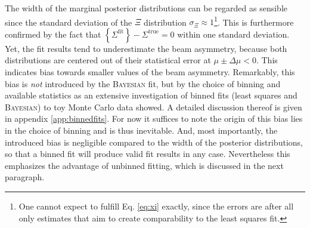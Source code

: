 The width of the marginal posterior distributions can be regarded as sensible since the standard deviation of the $\Xi$ distribution $\sigma_\Xi\approx1$\footnote{One cannot expect to fulfill Eq. \eqref{eq:xi} exactly, since the errors are after all only estimates that aim to create comparability to the least squares fit.}. This is furthermore confirmed by the fact that $\left\{\Sigma^\text{fit}\right\}-\Sigma^\text{true}=0$ within one standard deviation. Yet, the fit results tend to underestimate the beam asymmetry, because both distributions are centered out of their statistical error at $\mu\pm\Delta\mu<0$. This indicates bias towards smaller values of the beam asymmetry. Remarkably, this bias is \emph{not} introduced by the \textsc{Bayesian} fit, but by the choice of binning and available statistics as an extensive investigation of binned fits (least squares and \textsc{Bayesian}) to toy Monte Carlo data showed. A detailed discussion thereof is given in appendix \ref{app:binnedfits}. For now it suffices to note the origin of this bias lies in the choice of binning and is thus inevitable. And, most importantly, the introduced bias is negligible compared to the width of the posterior distributions, so that a binned fit will produce valid fit results in any case. Nevertheless this emphasizes the advantage of unbinned fitting, which is discussed in the next paragraph.

